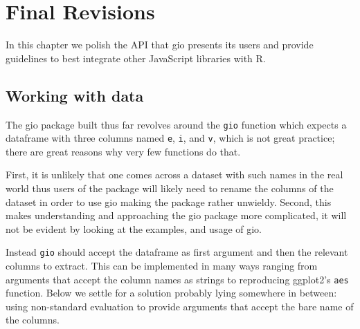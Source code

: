 \documentclass[
]{krantz}
\begin{document}
\hypertarget{final-revisions}{%
\chapter{Final Revisions}\label{final-revisions}}

In this chapter we polish the API that gio presents its users and provide guidelines to best integrate other JavaScript libraries with R.

\hypertarget{working-with-data}{%
\section{Working with data}\label{working-with-data}}

The gio package built thus far revolves around the \texttt{gio} function which expects a dataframe with three columns named \texttt{e}, \texttt{i}, and \texttt{v}, which is not great practice; there are great reasons why very few functions do that.

First, it is unlikely that one comes across a dataset with such names in the real world thus users of the package will likely need to rename the columns of the dataset in order to use gio making the package rather unwieldy. Second, this makes understanding and approaching the gio package more complicated, it will not be evident by looking at the examples, and usage of gio.

Instead \texttt{gio} should accept the dataframe as first argument and then the relevant columns to extract. This can be implemented in many ways ranging from arguments that accept the column names as strings to reproducing ggplot2's \texttt{aes} function. Below we settle for a solution probably lying somewhere in between: using non-standard evaluation to provide arguments that accept the bare name of the columns.
\end{document}
